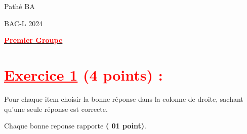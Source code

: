 \documentclass[12pt]{article}
\begin{document}
\begin{minipage}{0.8\textwidth}
	Pathé BA                          
\end{minipage}
\begin{minipage}{0.8\textwidth}
	BAC-L 2024
\end{minipage}

\begin{center}
\textbf{{\underline{\textcolor{red}{Premier Groupe}}}}
\end{center}

\section*{\textcolor{red}{\underline{Exercice 1} (4 points) :}}
Pour chaque item choisir la bonne réponse dans la colonne de droite, sachant qu'une seule réponse est correcte.

Chaque bonne reponse rapporte \textbf{( 01 point)}.
\end{document}
